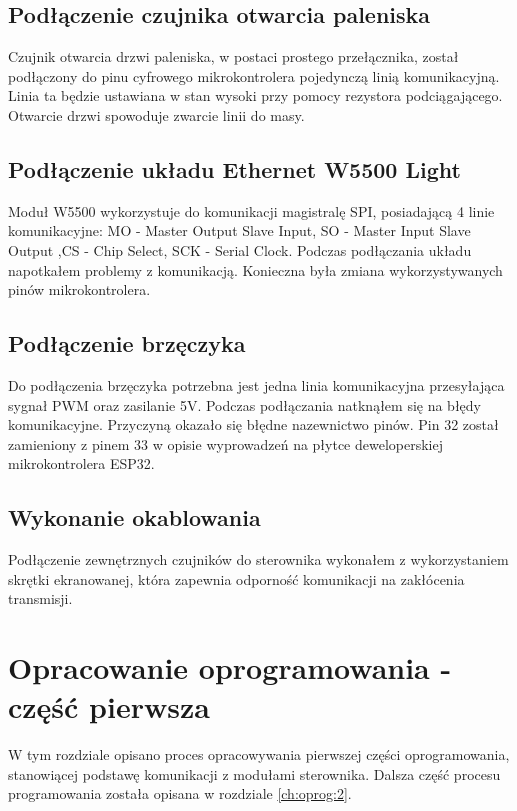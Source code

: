 \documentclass[11pt]{report}
\begin{document}
 \section{Podłączenie czujnika otwarcia paleniska}
 Czujnik otwarcia drzwi paleniska, w postaci prostego przełącznika, został podłączony do pinu cyfrowego mikrokontrolera pojedynczą linią komunikacyjną. Linia ta będzie ustawiana w stan wysoki przy pomocy rezystora podciągającego. Otwarcie drzwi spowoduje zwarcie linii do masy. 
 
  \section{Podłączenie układu Ethernet W5500 Light}
 Moduł W5500 wykorzystuje do komunikacji magistralę SPI, posiadającą 4 linie komunikacyjne: MO - Master Output Slave Input, SO - Master Input Slave Output ,CS - Chip Select, SCK - Serial Clock.
 Podczas podłączania układu napotkałem problemy z komunikacją. Konieczna była zmiana wykorzystywanych pinów mikrokontrolera.
 
 \section{Podłączenie brzęczyka}
 Do podłączenia brzęczyka potrzebna jest jedna linia komunikacyjna przesyłająca sygnał PWM oraz zasilanie 5V. 
 Podczas podłączania natknąłem się na błędy komunikacyjne. Przyczyną okazało się błędne nazewnictwo pinów. Pin 32 został zamieniony z pinem 33 w opisie wyprowadzeń na płytce deweloperskiej mikrokontrolera ESP32.
 
 
 \section{Wykonanie okablowania}
 Podłączenie zewnętrznych czujników do sterownika wykonałem z wykorzystaniem skrętki ekranowanej, która zapewnia odporność komunikacji na zakłócenia transmisji.
 
 
 \chapter{Opracowanie oprogramowania - część pierwsza}\label{ch:oprog:1}
 W tym rozdziale opisano proces opracowywania pierwszej części oprogramowania, stanowiącej podstawę komunikacji z modułami sterownika. Dalsza część procesu programowania została opisana w rozdziale \ref{ch:oprog:2}.
 
\end{document}
